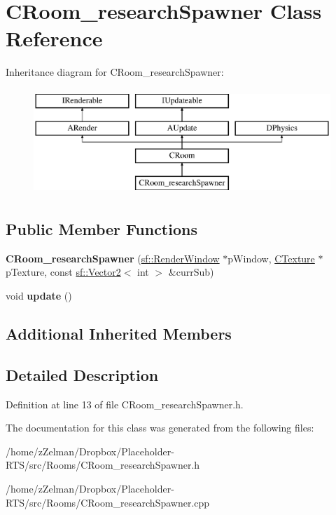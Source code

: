 \hypertarget{classCRoom__researchSpawner}{\section{C\-Room\-\_\-research\-Spawner Class Reference}
\label{classCRoom__researchSpawner}
}
Inheritance diagram for C\-Room\-\_\-research\-Spawner\-:\begin{figure}[H]
\begin{center}
\leavevmode
\includegraphics[height=4.000000cm]{classCRoom__researchSpawner}
\end{center}
\end{figure}
\subsection*{Public Member Functions}
\begin{DoxyCompactItemize}
\item 
\hypertarget{classCRoom__researchSpawner_a7d85f7246ab9b56925ee2a3bd6027afb}{{\bfseries C\-Room\-\_\-research\-Spawner} (\hyperlink{classsf_1_1RenderWindow}{sf\-::\-Render\-Window} $\ast$p\-Window, \hyperlink{classCTexture}{C\-Texture} $\ast$p\-Texture, const \hyperlink{classsf_1_1Vector2}{sf\-::\-Vector2}$<$ int $>$ \&curr\-Sub)}\label{classCRoom__researchSpawner_a7d85f7246ab9b56925ee2a3bd6027afb}

\item 
\hypertarget{classCRoom__researchSpawner_ab565078eeec1d2dded6f19a91e322665}{void {\bfseries update} ()}\label{classCRoom__researchSpawner_ab565078eeec1d2dded6f19a91e322665}

\end{DoxyCompactItemize}
\subsection*{Additional Inherited Members}


\subsection{Detailed Description}


Definition at line 13 of file C\-Room\-\_\-research\-Spawner.\-h.



The documentation for this class was generated from the following files\-:\begin{DoxyCompactItemize}
\item 
/home/z\-Zelman/\-Dropbox/\-Placeholder-\/\-R\-T\-S/src/\-Rooms/C\-Room\-\_\-research\-Spawner.\-h\item 
/home/z\-Zelman/\-Dropbox/\-Placeholder-\/\-R\-T\-S/src/\-Rooms/C\-Room\-\_\-research\-Spawner.\-cpp\end{DoxyCompactItemize}
